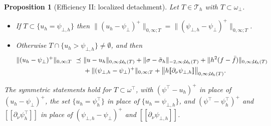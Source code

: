 \documentclass[12pt]{amsart}
\numberwithin{equation}{section}
\theoremstyle{plain}
\newtheorem{proposition}[theorem]{Proposition}
\theoremstyle{definition}
\theoremstyle{remark}
\newcommand{\psilo}{\psi_\bot}
\newcommand{\psiup}{\psi^\top}
\newcommand{\psiloh}{\psi_{\bot,h}}
\newcommand{\psiuph}{\psi^\top_h}
\newcommand{\Th}{\mathcal{T}_h}
\newcommand{\Uh}{\mathcal{U}_h}
\newcommand{\jump}[1]{[\![#1]\!]}
\newcommand{\ombot}{\omega_\bot}
\newcommand{\omtop}{\omega^\top}
\begin{document}
\begin{proposition}[Efficiency II: localized detachment]
\label{prop:effdetach}
Let $T \in \Th$ with $T \subset \ombot$.
\begin{itemize}
\item[(i)] If $T \subset \{u_h = \psiloh\}$ then $\|(u_h-\psilo)^+\|_{0,\infty;T} = \|(\psiloh-\psilo)^+\|_{0,\infty;T}$.
\item[(ii)] Otherwise $T \cap \{u_h > \psiloh\} \ne \emptyset$, and then
\begin{align}
\label{eq:effdetach}
  \|(u_h-\psilo)^+\|_{0,\infty;T} \ \preceq\ & \|u-u_h\|_{0,\infty;\Uh(T)} + \|\sigma-\tilde\sigma_h\|_{-2,\infty;\Uh(T)} + \|h^2(f-\bar f)\|_{0,\infty;\Uh(T)} \\
  & + \|(\psiloh-\psilo)^+\|_{0,\infty;T} + \bigl\|h\jump{\partial_\nu \psiloh}\bigr\|_{0,\infty;\Uh(T)}. \notag
\end{align}
\end{itemize}
The symmetric statements hold for $T \subset \omtop$, with $(\psiup - u_h)^+$ in place of $(u_h-\psilo)^+$, the set $\{u_h = \psiuph\}$ in place of $\{u_h = \psiloh\}$, and $(\psiup - \psiuph)^+$ and $\jump{\partial_\nu \psiuph}$ in place of $(\psiloh-\psilo)^+$ and $\jump{\partial_\nu \psiloh}$.
\end{proposition}
\end{document}
